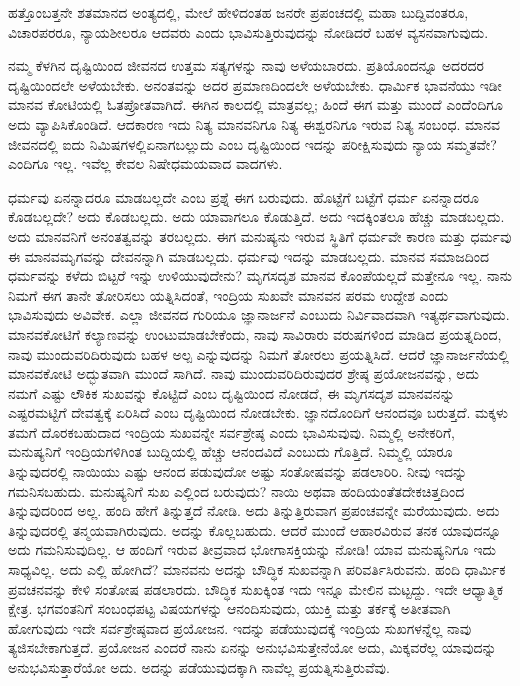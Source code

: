 \vskip 2pt

ಹತ್ತೊಂಬತ್ತನೇ ಶತಮಾನದ ಅಂತ್ಯದಲ್ಲಿ, ಮೇಲೆ ಹೇಳಿದಂತಹ ಜನರೇ ಪ್ರಪಂಚದಲ್ಲಿ ಮಹಾ ಬುದ್ದಿವಂತರೂ, ವಿಚಾರಪರರೂ, ನ್ಯಾಯಶೀಲರೂ ಆದವರು ಎಂದು ಭಾವಿಸುತ್ತಿರುವುದನ್ನು ನೋಡಿದರೆ ಬಹಳ ವ್ಯಸನವಾಗುವುದು.

\vskip 2pt

ನಮ್ಮ ಕೆಳಗಿನ ದೃಷ್ಟಿಯಿಂದ ಜೀವನದ ಉತ್ತಮ ಸತ್ಯಗಳನ್ನು ನಾವು ಅಳೆಯಬಾರದು. ಪ್ರತಿಯೊಂದನ್ನೂ ಅದರದರ ದೃಷ್ಟಿಯಿಂದಲೇ ಅಳೆಯಬೇಕು. ಅನಂತವನ್ನು ಅದರ ಪ್ರಮಾಣದಿಂದಲೇ ಅಳೆಯಬೇಕು. ಧಾರ್ಮಿಕ ಭಾವನೆಯು ಇಡೀ ಮಾನವ ಕೋಟಿಯಲ್ಲಿ ಓತಪ್ರೋತವಾಗಿದೆ. ಈಗಿನ ಕಾಲದಲ್ಲಿ ಮಾತ್ರವಲ್ಲ; ಹಿಂದೆ ಈಗ ಮತ್ತು ಮುಂದೆ ಎಂದೆಂದಿಗೂ ಅದು ವ್ಯಾಪಿಸಿಕೊಂಡಿದೆ. ಆದಕಾರಣ ಇದು ನಿತ್ಯ ಮಾನವನಿಗೂ ನಿತ್ಯ ಈಶ್ವರನಿಗೂ ಇರುವ ನಿತ್ಯ ಸಂಬಂಧ. ಮಾನವ ಜೀವನದಲ್ಲಿ ಐದು ನಿಮಿಷಗಳಲ್ಲಿ\break ಏನಾಗಬಲ್ಲುದು ಎಂಬ ದೃಷ್ಟಿಯಿಂದ ಇದನ್ನು ಪರೀಕ್ಷಿಸುವುದು ನ್ಯಾಯ ಸಮ್ಮತವೇ? ಎಂದಿಗೂ ಇಲ್ಲ. ಇವೆಲ್ಲ ಕೇವಲ ನಿಷೇಧಮಯವಾದ ವಾದಗಳು.

\vskip 2pt

ಧರ್ಮವು ಏನನ್ನಾದರೂ ಮಾಡಬಲ್ಲದೇ ಎಂಬ ಪ್ರಶ್ನೆ ಈಗ ಬರುವುದು. ಹೊಟ್ಟೆಗೆ ಬಟ್ಟೆಗೆ ಧರ್ಮ ಏನನ್ನಾದರೂ ಕೊಡಬಲ್ಲದೇ? ಅದು ಕೊಡಬಲ್ಲದು. ಅದು ಯಾವಾಗಲೂ ಕೊಡುತ್ತಿದೆ. ಅದು ಇದಕ್ಕಿಂತಲೂ ಹೆಚ್ಚು ಮಾಡಬಲ್ಲದು. ಅದು ಮಾನವನಿಗೆ ಅನಂತತ್ವವನ್ನು ತರಬಲ್ಲದು. ಈಗ ಮನುಷ್ಯನು ಇರುವ ಸ್ಥಿತಿಗೆ ಧರ್ಮವೇ ಕಾರಣ ಮತ್ತು ಧರ್ಮವು ಈ ಮಾನವಮೃಗವನ್ನು ದೇವನನ್ನಾಗಿ ಮಾಡಬಲ್ಲದು. ಧರ್ಮವು ಇದನ್ನು ಮಾಡಬಲ್ಲದು. ಮಾನವ ಸಮಾಜದಿಂದ ಧರ್ಮವನ್ನು ಕಳೆದು ಬಿಟ್ಟರೆ ಇನ್ನು ಉಳಿಯುವುದೇನು? ಮೃಗಸದೃಶ ಮಾನವ ಕೊಂಪೆಯಲ್ಲದೆ ಮತ್ತೇನೂ ಇಲ್ಲ. ನಾನು ನಿಮಗೆ ಈಗ ತಾನೇ ತೋರಿಸಲು ಯತ್ನಿಸಿದಂತೆ, ಇಂದ್ರಿಯ ಸುಖವೇ ಮಾನವನ ಪರಮ ಉದ್ದೇಶ ಎಂದು ಭಾವಿಸುವುದು ಅವಿವೇಕ. ಎಲ್ಲಾ ಜೀವನದ ಗುರಿಯೂ ಜ್ಞಾನಾರ್ಜನೆ ಎಂಬುದು ನಿರ್ವಿವಾದವಾಗಿ ಇತ್ಯರ್ಥವಾಗುವುದು. ಮಾನವಕೋಟಿಗೆ ಕಲ್ಯಾಣವನ್ನು ಉಂಟುಮಾಡಬೇಕೆಂದು, ನಾವು ಸಾವಿರಾರು ವರುಷಗಳಿಂದ ಮಾಡಿದ ಪ್ರಯತ್ನದಿಂದ, ನಾವು ಮುಂದುವರಿದಿರುವುದು ಬಹಳ ಅಲ್ಪ ಎನ್ನುವುದನ್ನು ನಿಮಗೆ ತೋರಲು ಪ್ರಯತ್ನಿಸಿದೆ. ಆದರೆ ಜ್ಞಾನಾರ್ಜನೆಯಲ್ಲಿ ಮಾನವಕೋಟಿ ಅದ್ಭುತವಾಗಿ ಮುಂದೆ ಸಾಗಿದೆ. ನಾವು ಮುಂದುವರಿದಿರುವುದರ ಶ್ರೇಷ್ಠ ಪ್ರಯೋಜನವನ್ನು, ಅದು ನಮಗೆ ಎಷ್ಟು ಲೌಕಿಕ ಸುಖವನ್ನು ಕೊಟ್ಟಿದೆ ಎಂಬ ದೃಷ್ಟಿಯಿಂದ ನೋಡದೆ, ಈ ಮೃಗಸದೃಶ ಮಾನವನನ್ನು ಎಷ್ಟರಮಟ್ಟಿಗೆ ದೇವತ್ವಕ್ಕೆ ಏರಿಸಿದೆ ಎಂಬ ದೃಷ್ಟಿಯಿಂದ ನೋಡಬೇಕು. ಜ್ಞಾನದೊಂದಿಗೆ ಆನಂದವೂ ಬರುತ್ತದೆ. ಮಕ್ಕಳು ತಮಗೆ ದೊರಕಬಹುದಾದ ಇಂದ್ರಿಯ ಸುಖವನ್ನೇ ಸರ್ವಶ್ರೇಷ್ಠ ಎಂದು ಭಾವಿಸುವುವು. ನಿಮ್ಮಲ್ಲಿ ಅನೇಕರಿಗೆ, ಮನುಷ್ಯನಿಗೆ ಇಂದ್ರಿಯಗಳಿಗಿಂತ ಬುದ್ದಿಯಲ್ಲಿ ಹೆಚ್ಚು ಆನಂದವಿದೆ ಎಂಬುದು ಗೊತ್ತಿದೆ. ನಿಮ್ಮಲ್ಲಿ ಯಾರೂ ತಿನ್ನುವುದರಲ್ಲಿ ನಾಯಿಯು ಎಷ್ಟು ಆನಂದ ಪಡುವುದೋ ಅಷ್ಟು ಸಂತೋಷವನ್ನು ಪಡಲಾರಿರಿ. ನೀವು ಇದನ್ನು ಗಮನಿಸಬಹುದು. ಮನುಷ್ಯನಿಗೆ ಸುಖ ಎಲ್ಲಿಂದ ಬರುವುದು? ನಾಯಿ ಅಥವಾ ಹಂದಿಯಂತೆ\break ತದೇಕಚಿತ್ತದಿಂದ ತಿನ್ನುವುದರಿಂದ ಅಲ್ಲ. ಹಂದಿ ಹೇಗೆ ತಿನ್ನುತ್ತದೆ ನೋಡಿ. ಅದು ತಿನ್ನುತ್ತಿರುವಾಗ ಪ್ರಪಂಚವನ್ನೇ ಮರೆಯುವುದು. ಅದು ತಿನ್ನುವುದರಲ್ಲಿ ತನ್ಮಯವಾಗಿರುವುದು. ಅದನ್ನು ಕೊಲ್ಲಬಹುದು. ಆದರೆ ಮುಂದೆ ಆಹಾರವಿರುವ ತನಕ ಯಾವುದನ್ನೂ ಅದು ಗಮನಿಸುವುದಿಲ್ಲ. ಆ ಹಂದಿಗೆ ಇರುವ ತೀವ್ರವಾದ ಭೋಗಾಸಕ್ತಿಯನ್ನು ನೋಡಿ! ಯಾವ ಮನುಷ್ಯನಿಗೂ ಇದು ಸಾಧ್ಯವಿಲ್ಲ. ಅದು ಎಲ್ಲಿ ಹೋಗಿದೆ? ಮಾನವನು ಅದನ್ನು ಬೌದ್ಧಿಕ ಸುಖವನ್ನಾಗಿ ಪರಿವರ್ತಿಸಿರುವನು. ಹಂದಿ ಧಾರ್ಮಿಕ ಪ್ರವಚನವನ್ನು ಕೇಳಿ ಸಂತೋಷ ಪಡಲಾರದು. ಬೌದ್ಧಿಕ ಸುಖಕ್ಕಿಂತ ಇದು ಇನ್ನೂ ಮೇಲಿನ ಮಟ್ಟದ್ದು. ಇದೇ ಆಧ್ಯಾತ್ಮಿಕ ಕ್ಷೇತ್ರ. ಭಗವಂತನಿಗೆ ಸಂಬಂಧಪಟ್ಟ ವಿಷಯಗಳನ್ನು ಆನಂದಿಸುವುದು, ಯುಕ್ತಿ ಮತ್ತು ತರ್ಕಕ್ಕೆ ಅತೀತವಾಗಿ ಹೋಗುವುದು ಇದೇ ಸರ್ವಶ್ರೇಷ್ಠವಾದ ಪ್ರಯೋಜನ. ಇದನ್ನು ಪಡೆಯುವುದಕ್ಕೆ ಇಂದ್ರಿಯ ಸುಖಗಳನ್ನೆಲ್ಲ ನಾವು ತ್ಯಜಿಸಬೇಕಾಗುತ್ತದೆ. ಪ್ರಯೋಜನ ಎಂದರೆ ನಾನು ಏನನ್ನು ಅನುಭವಿಸುತ್ತೇನೆಯೋ ಅದು, ಮಿಕ್ಕವರೆಲ್ಲ ಯಾವುದನ್ನು ಅನುಭವಿಸುತ್ತಾರೆಯೋ ಅದು. ಅದನ್ನು ಪಡೆಯುವುದಕ್ಕಾಗಿ ನಾವೆಲ್ಲ ಪ್ರಯತ್ನಿಸುತ್ತಿರುವೆವು.

